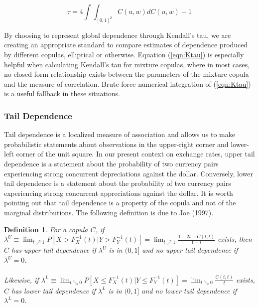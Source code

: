 \documentclass[12pt]{article}
\newtheorem{defn}{Definition}
\begin{document}
\begin{equation} \label{eqn:Ktau}
\tau = 4\int\int_{\left[0,1\right]^{2}}C\left(u,w\right)dC\left(u,w\right) - 1 
\end{equation}

By choosing to represent global dependence through Kendall's tau, we are
creating an appropriate standard to compare estimates of dependence
produced by different copulas, elliptical or otherwise. Equation
(\ref{eqn:Ktau}) is especially helpful when calculating Kendall's tau for
mixture copulas, where in most cases, no closed form relationship exists
between the parameters of the mixture copula and the measure of correlation.
Brute force numerical integration of (\ref{eqn:Ktau}) is a useful fallback
in these situations.

\subsubsection{Tail Dependence}

Tail dependence is a localized measure of association and allows us to
make probabilistic statements about observations in the upper-right corner
and lower-left corner of the unit square. In our present context on
exchange rates, upper tail dependence is a statement about the probability
of two currency pairs experiencing strong concurrent depreciations against
the dollar. Conversely, lower tail dependence is a statement about the
probability of two currency pairs experiencing strong concurrent
appreciations against the dollar. It is worth pointing out that tail
dependence is a property of the copula and not of the marginal distributions.
The following definition is due to Joe (1997).

\begin{defn} \label{defn:tail_dep}
For a copula $C$, if $\lambda^{U}\equiv\lim_{t\nearrow 1}P\left[X > F_{X}^{-1}\left(t\right) | Y > F_{Y}^{-1}\left(t\right)\right] = \lim_{t\nearrow 1}\frac{1-2t+C\left(t,t\right)}{1-t}$ exists, then $C$ has upper tail dependence if $\lambda^{U}$ is in $(0,1]$ and no upper tail dependence if $\lambda^{U}=0$. \\ \\ Likewise, if $\lambda ^{L}\equiv \lim_{t\searrow 0}P\left[X\leq F_{X}^{-1}\left(t\right) | Y\leq F_{Y}^{-1}\left(t\right)\right] =\lim_{t\searrow 0}\frac{C\left(t,t\right)}{t}$ exists, $C$ has lower tail dependence if $\lambda ^{L}$ is in $(0,1]$ and no lower tail dependence if $\lambda^{L} = 0$.
\end{defn}
\end{document}
